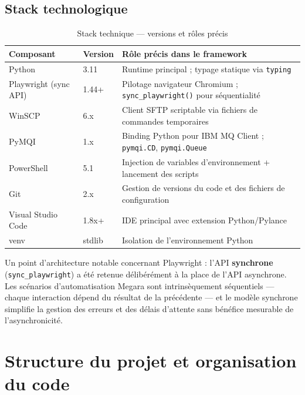 \documentclass[12pt, a4paper]{report}
\begin{document}
\subsection{Stack technologique}

\begin{table}[H]
\centering
\caption{Stack technique — versions et rôles précis}
\label{tab:stack}
\begin{tabularx}{\textwidth}{llX}
\toprule
\textbf{Composant}    & \textbf{Version} & \textbf{Rôle précis dans le framework} \\
\midrule
Python                & 3.11             & Runtime principal ; typage statique via \texttt{typing} \\
Playwright (sync API) & 1.44+            & Pilotage navigateur Chromium ; \texttt{sync\_playwright()} pour séquentialité \\
WinSCP                & 6.x              & Client SFTP scriptable via fichiers de commandes temporaires \\
PyMQI                 & 1.x              & Binding Python pour IBM MQ Client ; \texttt{pymqi.CD}, \texttt{pymqi.Queue} \\
PowerShell            & 5.1              & Injection de variables d'environnement + lancement des scripts \\
Git                   & 2.x              & Gestion de versions du code et des fichiers de configuration \\
Visual Studio Code    & 1.8x+            & IDE principal avec extension Python/Pylance \\
venv                  & stdlib           & Isolation de l'environnement Python \\
\bottomrule
\end{tabularx}
\end{table}

Un point d'architecture notable concernant Playwright : l'API \textbf{synchrone} (\texttt{sync\_playwright}) a été retenue délibérément à la place de l'API asynchrone. Les scénarios d'automatisation Megara sont intrinsèquement séquentiels — chaque interaction dépend du résultat de la précédente — et le modèle synchrone simplifie la gestion des erreurs et des délais d'attente sans bénéfice mesurable de l'asynchronicité.

\section{Structure du projet et organisation du code}
\end{document}
